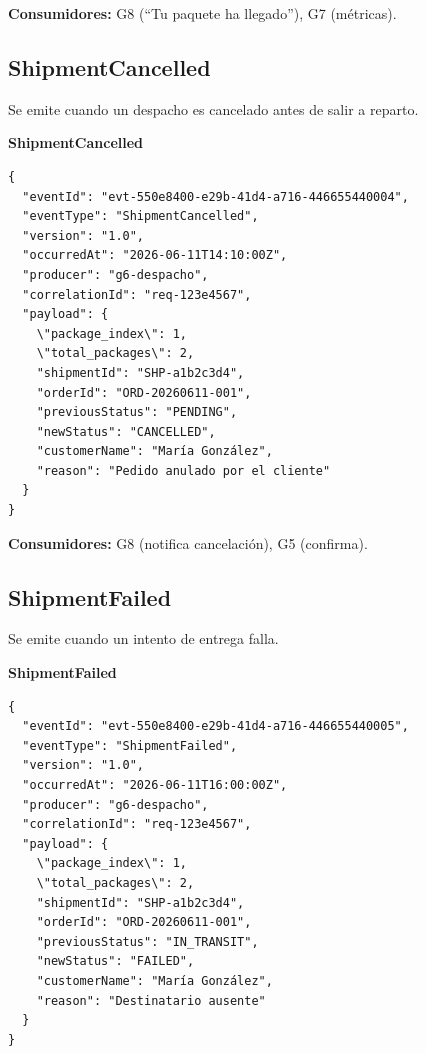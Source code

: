 \documentclass[11pt, a4paper]{article}
\newcommand{\contractheader}[1]{%
  \noindent\colorbox{primary!10}{%
    \parbox{\dimexpr\textwidth-2\fboxsep}{%
      \textbf{\faFileCode\quad #1}%
    }%
  }
  \vspace{0.3cm}
}
\begin{document}
\textbf{Consumidores:} G8 (``Tu paquete ha llegado''), G7 (métricas).

\vspace{0.4cm}

\subsection{ShipmentCancelled}

Se emite cuando un despacho es cancelado antes de salir a reparto.

\contractheader{ShipmentCancelled}

\begin{lstlisting}
{
  "eventId": "evt-550e8400-e29b-41d4-a716-446655440004",
  "eventType": "ShipmentCancelled",
  "version": "1.0",
  "occurredAt": "2026-06-11T14:10:00Z",
  "producer": "g6-despacho",
  "correlationId": "req-123e4567",
  "payload": {
    \"package_index\": 1,
    \"total_packages\": 2,
    "shipmentId": "SHP-a1b2c3d4",
    "orderId": "ORD-20260611-001",
    "previousStatus": "PENDING",
    "newStatus": "CANCELLED",
    "customerName": "María González",
    "reason": "Pedido anulado por el cliente"
  }
}
\end{lstlisting}

\textbf{Consumidores:} G8 (notifica cancelación), G5 (confirma).

\vspace{0.4cm}

\subsection{ShipmentFailed}

Se emite cuando un intento de entrega falla.

\contractheader{ShipmentFailed}

\begin{lstlisting}
{
  "eventId": "evt-550e8400-e29b-41d4-a716-446655440005",
  "eventType": "ShipmentFailed",
  "version": "1.0",
  "occurredAt": "2026-06-11T16:00:00Z",
  "producer": "g6-despacho",
  "correlationId": "req-123e4567",
  "payload": {
    \"package_index\": 1,
    \"total_packages\": 2,
    "shipmentId": "SHP-a1b2c3d4",
    "orderId": "ORD-20260611-001",
    "previousStatus": "IN_TRANSIT",
    "newStatus": "FAILED",
    "customerName": "María González",
    "reason": "Destinatario ausente"
  }
}
\end{lstlisting}
\end{document}
